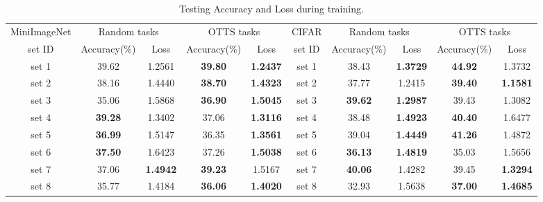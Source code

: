 \documentclass[10pt,journal,compsoc]{IEEEtran}
\begin{document}
\begin{table*}[!t]
\renewcommand{\arraystretch}{1.8}
\caption{Testing Accuracy and Loss during training.}
\label{loss_table}
\centering
\begin{tabular}{cccccccccc}
\toprule
MiniImageNet&\multicolumn{2}{c}{Random tasks}&\multicolumn{2}{c}{OTTS tasks}    &CIFAR      &\multicolumn{2}{c}{Random tasks}&\multicolumn{2}{c}{OTTS tasks}\\
\cmidrule(r){2-3} \cmidrule(l){4-5} \cmidrule(l){7-8} \cmidrule(l){9-10}
set ID          &Accuracy(\%)    &Loss        &Accuracy(\%)     &Loss   & set ID    &Accuracy(\%)    &Loss        &Accuracy(\%)     &Loss\\ 
\midrule
set 1              &39.62          &1.2561         &\textbf{39.80}          &\textbf{1.2437}    &set 1       &38.43      &\textbf{1.3729}         &\textbf{44.92}      &1.3732\\
set 2              &38.16          &1.4440         &\textbf{38.70}          &\textbf{1.4323}    &set 2       &37.77      &1.2415         &\textbf{39.40}      &\textbf{1.1581}\\
set 3              &35.06          &1.5868         &\textbf{36.90}          &\textbf{1.5045}    &set 3       &\textbf{39.62}      &\textbf{1.2987}         &39.43      &1.3082\\
set 4              &\textbf{39.28}          &1.3402         &37.06          &\textbf{1.3116}    &set 4       &38.48      &\textbf{1.4923}         &\textbf{40.40}      &1.6477\\
set 5              &\textbf{36.99}          &1.5147         &36.35          &\textbf{1.3561}    &set 5       &39.04      &\textbf{1.4449}         &\textbf{41.26}      &1.4872\\
set 6              &\textbf{37.50}          &1.6423         &37.26          &\textbf{1.5038}    &set 6       &\textbf{36.13}      &\textbf{1.4819}         &35.03      &1.5656\\
set 7              &37.06          &\textbf{1.4942}         &\textbf{39.23}          &1.5167    &set 7       &\textbf{40.06}      &1.4282         &39.45      &\textbf{1.3294}\\
set 8              &35.77          &1.4184         &\textbf{36.06}          &\textbf{1.4020}    &set 8       &32.93      &1.5638         &\textbf{37.00}      &\textbf{1.4685}\\

\end{tabular}
\end{table*}
\end{document}
